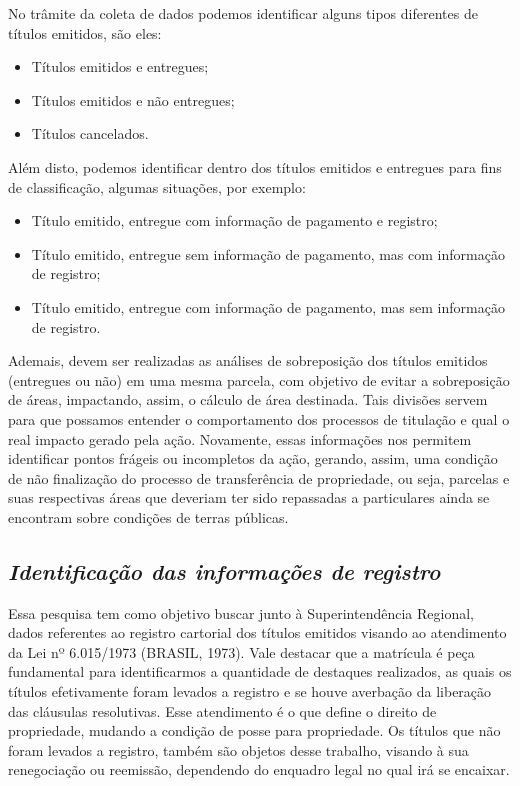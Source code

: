 \documentclass[
  letterpaper,
]{report}
\providecommand{\tightlist}{%
  \setlength{\itemsep}{0pt}\setlength{\parskip}{0pt}}\usepackage{longtable,booktabs,array}
\begin{document}
No trâmite da coleta de dados podemos identificar alguns tipos
diferentes de títulos emitidos, são eles:

\begin{itemize}
\tightlist
\item
  Títulos emitidos e entregues;
\item
  Títulos emitidos e não entregues;
\item
  Títulos cancelados.
\end{itemize}

Além disto, podemos identificar dentro dos títulos emitidos e entregues
para fins de classificação, algumas situações, por exemplo:

\begin{itemize}
\tightlist
\item
  Título emitido, entregue com informação de pagamento e registro;
\item
  Título emitido, entregue sem informação de pagamento, mas com
  informação de registro;
\item
  Título emitido, entregue com informação de pagamento, mas sem
  informação de registro.
\end{itemize}

Ademais, devem ser realizadas as análises de sobreposição dos títulos
emitidos (entregues ou não) em uma mesma parcela, com objetivo de evitar
a sobreposição de áreas, impactando, assim, o cálculo de área destinada.
Tais divisões servem para que possamos entender o comportamento dos
processos de titulação e qual o real impacto gerado pela ação.
Novamente, essas informações nos permitem identificar pontos frágeis ou
incompletos da ação, gerando, assim, uma condição de não finalização do
processo de transferência de propriedade, ou seja, parcelas e suas
respectivas áreas que deveriam ter sido repassadas a particulares ainda
se encontram sobre condições de terras públicas.

\hypertarget{identificauxe7uxe3o-das-informauxe7uxf5es-de-registro}{%
\subsection{\texorpdfstring{\emph{Identificação das informações de
registro}}{Identificação das informações de registro}}\label{identificauxe7uxe3o-das-informauxe7uxf5es-de-registro}}

Essa pesquisa tem como objetivo buscar junto à Superintendência
Regional, dados referentes ao registro cartorial dos títulos emitidos
visando ao atendimento da Lei nº 6.015/1973 (BRASIL, 1973). Vale
destacar que a matrícula é peça fundamental para identificarmos a
quantidade de destaques realizados, as quais os títulos efetivamente
foram levados a registro e se houve averbação da liberação das cláusulas
resolutivas. Esse atendimento é o que define o direito de propriedade,
mudando a condição de posse para propriedade. Os títulos que não foram
levados a registro, também são objetos desse trabalho, visando à sua
renegociação ou reemissão, dependendo do enquadro legal no qual irá se
encaixar.
\end{document}
